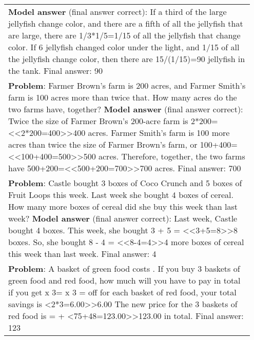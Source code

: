 \documentclass[11pt, a4paper, logo]{deepmind}
\begin{document}
{\begin{longtable}{p{0.95\linewidth}}
{\textbf{Model answer} (final answer correct): If a third of the large jellyfish change color, and there are a fifth of all the jellyfish that are large, there are 1/3*1/5=1/15 of all the jellyfish that change color. \newline
If 6 jellyfish changed color under the light, and 1/15 of all the jellyfish change color, then there are 15/(1/15)=90 jellyfish in the tank. \newline
Final answer:  90} \newline \\
{\small \textbf{Problem}: Farmer Brown's farm is 200 acres, and Farmer Smith's farm is 100 acres more than twice that. How many acres do the two farms have, together? \newline
\textbf{Model answer} (final answer correct): Twice the size of Farmer Brown's 200-acre farm is 2*200=<<2*200=400>>400 acres. \newline
Farmer Smith's farm is 100 more acres than twice the size of Farmer Brown's farm, or 100+400=<<100+400=500>>500 acres. \newline
Therefore, together, the two farms have 500+200=<<500+200=700>>700 acres. \newline
Final answer:  700} \newline \\
{\small \textbf{Problem}: Castle bought 3 boxes of Coco Crunch and 5 boxes of Fruit Loops this week. Last week she bought 4 boxes of cereal. How many more boxes of cereal did she buy this week than last week? \newline
\textbf{Model answer} (final answer correct): Last week, Castle bought 4 boxes. \newline
This week, she bought 3 + 5 = <<3+5=8>>8 boxes. \newline
So, she bought 8 - 4 = <<8-4=4>>4 more boxes of cereal this week than last week. \newline
Final answer:  4} \newline \\
{\small \textbf{Problem}: A basket of green food costs \18. If you buy 3 baskets of green food and red food, how much will you have to pay in total if you get \25 x 3= \18 x 3 = \2 off for each basket of red food, your total savings is \<<2*3=6.00>>6.00 \newline
The new price for the 3 baskets of red food is \6 = \75 + \<<75+48=123.00>>123.00 in total. \newline
Final answer:  123} \newline \\

\end{longtable}}
\end{document}
